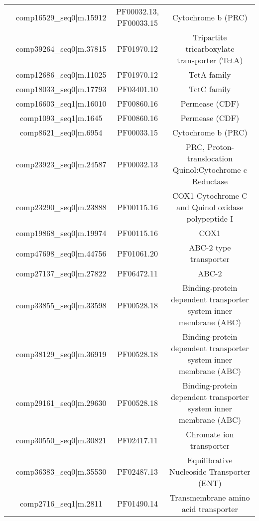 \begin{table}
\begin{tabular}{|c|c|c|c|}
                            & comp16529\_seq0|m.15912 & PF00032.13, PF00033.15 & Cytochrome b (PRC) \\
                            & comp39264\_seq0|m.37815 & PF01970.12 & Tripartite tricarboxylate transporter (TctA) \\
                            & comp12686\_seq0|m.11025 & PF01970.12 & TctA family  \\
                            & comp18033\_seq0|m.17793 & PF03401.10 & TctC family \\
                            & comp16603\_seq1|m.16010 & PF00860.16 & Permease (CDF) \\
                            & comp1093\_seq1|m.1645   & PF00860.16 & Permease (CDF) \\
                            & comp8621\_seq0|m.6954   & PF00033.15 & Cytochrome b (PRC) \\
                            & comp23923\_seq0|m.24587 & PF00032.13 & PRC, Proton-translocation Quinol:Cytochrome c Reductase\\
                            & comp23290\_seq0|m.23888 & PF00115.16 & COX1 Cytochrome C and Quinol oxidase polypeptide I \\
                            & comp19868\_seq0|m.19974 & PF00115.16 & COX1 \\
                            & comp47698\_seq0|m.44756 & PF01061.20 & ABC-2 type transporter \\
                            & comp27137\_seq0|m.27822 & PF06472.11 & ABC-2 \\
                            & comp33855\_seq0|m.33598 & PF00528.18 & Binding-protein dependent transporter system inner membrane (ABC)\\
                            & comp38129\_seq0|m.36919 & PF00528.18 & Binding-protein dependent transporter system inner membrane (ABC)\\ 
                            & comp29161\_seq0|m.29630 & PF00528.18 & Binding-protein dependent transporter system inner membrane (ABC)\\
                            & comp30550\_seq0|m.30821 & PF02417.11 & Chromate ion transporter \\
                            & comp36383\_seq0|m.35530 & PF02487.13 & Equilibrative Nucleoside Transporter (ENT)\\
                            & comp2716\_seq1|m.2811   & PF01490.14 & Transmembrane amino acid transporter \\

\end{tabular}
\end{table}
